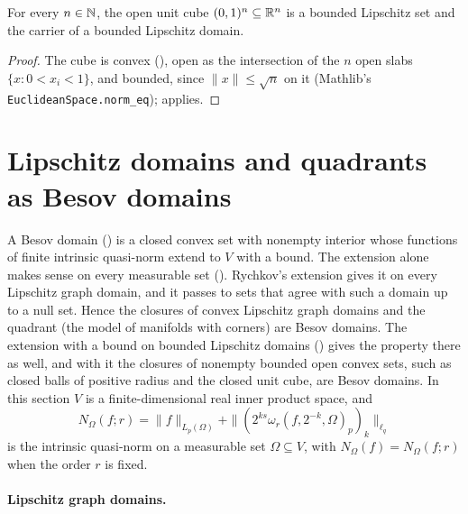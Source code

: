 \begin{corollary}
\label{cor:unit-cube-lipschitz}
\leanok
{}
For every $n \in \mathbb{N}$, the open unit cube $(0, 1)^n \subseteq \mathbb{R}^n$ is a bounded Lipschitz
set and the carrier of a bounded Lipschitz domain.
\end{corollary}

\begin{proof}
\leanok
The cube is convex (), open as the intersection of the $n$ open slabs
$\{x : 0 < x_i < 1\}$, and
bounded, since $\|x\| \leq \sqrt{n}$ on it (Mathlib's
\texttt{EuclideanSpace.\allowbreak norm\_\allowbreak eq});  applies.
\end{proof}

\section{Lipschitz domains and quadrants as Besov domains}
\label{sec:graph-besov-domains}

A Besov domain () is a closed convex set with nonempty interior whose
functions of finite intrinsic quasi-norm extend to $V$ with a bound. The extension alone makes
sense on every measurable set (). Rychkov's extension
\cite{Rychkov} gives it on every Lipschitz graph domain, and it passes to sets that agree with such
a domain up to a null set. Hence the closures of convex Lipschitz graph domains and the quadrant
(the model of manifolds with corners) are Besov domains. The extension with a bound on bounded
Lipschitz domains () gives the property there as well, and with
it the closures of nonempty bounded open convex sets, such as closed balls of positive radius and
the closed unit cube, are Besov domains. In this section $V$ is a finite-dimensional real inner
product space, and
\[
  N_\Omega(f; r) = \|f\|_{L_p(\Omega)} + \|(2^{ks} \omega_r(f, 2^{-k}, \Omega)_p)_k\|_{\ell_q}
\]
is the intrinsic quasi-norm on a measurable set $\Omega \subseteq V$, with $N_\Omega(f) =
N_\Omega(f; r)$ when the order $r$ is fixed.

\paragraph{Lipschitz graph domains.}

